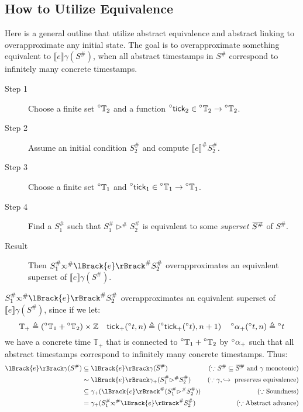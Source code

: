 \documentclass[acmsmall,screen,review]{acmart}\settopmatter{printfolios=true,printccs=false,printacmref=false}
\def\ovbarw{1.2mu}
\def\ovbarh{1}
\newcommand*{\ovbar}[1]{\mkern \ovbarw\overline{\mkern-\ovbarw{\smash{#1}\scalebox{1}[\ovbarh]{\vphantom{i}}}\mkern-\ovbarw}\mkern \ovbarw}
\newcommand*{\A}[1]{\prescript{\circ}{}{#1}}
\newcommand*{\Abs}[1]{{#1}^{\#}}
\newcommand*{\Time}{\mathbb{T}}
\newcommand*{\ATime}{\A{\Time}}
\newcommand*{\semarrow}{\hookrightarrow}
\newcommand*{\semlink}{\mathbin{\rotatebox[origin=c]{180}{$\propto$}}}
\newcommand*{\equivalent}{\sim}
\newcommand*{\sembracket}[1]{\lBrack{#1}\rBrack}
\newcommand*{\tick}{\mathsf{tick}}
\begin{document}
\subsection{How to Utilize Equivalence}
Here is a general outline that utilize abstract equivalence and abstract linking to overapproximate any initial state.
The goal is to overapproximate something equivalent to $\sembracket{e}\gamma(\Abs{S})$, when all abstract timestamps in $\Abs{S}$ correspond to infinitely many concrete timestamps.
\begin{description}
  \item[Step 1] Choose a finite set $\A\Time_2$ and a function $\A\tick_2\in\A\Time_2\rightarrow\A\Time_2$.
  \item[Step 2] Assume an initial condition $\Abs{S}_2$ and compute $\Abs{\sembracket{e}}\Abs{S}_2$.
  \item[Step 3] Choose a finite set $\A\Time_1$ and $\A\tick_1\in\A\Time_1\rightarrow\A\Time_1$.
  \item[Step 4] Find a $\Abs{S}_1$ such that $\Abs{S}_1\Abs\rhd\Abs{S}_2$ is equivalent to some \emph{superset} $\ovbar{\Abs{S}}$ of $\Abs{S}$.
  \item[Result] Then $\Abs{S}_1\Abs\semlink\Abs{\sembracket{e}}\Abs{S}_2$ overapproximates an equivalent superset of $\sembracket{e}\gamma(\Abs{S})$.
\end{description}
$\Abs{S}_1\Abs\semlink\Abs{\sembracket{e}}\Abs{S}_2$ overapproximates an equivalent superset of $\sembracket{e}\gamma(\Abs{S})$, since if we let:
\[\Time_+\triangleq(\ATime_1+\ATime_2)\times\mathbb{Z}\quad\tick_+(\A{t},n)\triangleq(\A\tick_+(\A{t}),n+1)\quad\A\alpha_+(\A{t},n)\triangleq\A{t}\]
we have a concrete time $\Time_+$ that is connected to $\ATime_1+\ATime_2$ by $\A\alpha_+$ such that all abstract timestamps correspond to infinitely many concrete timestamps.
Thus:
\begin{align*}
  \sembracket{e}\gamma(\Abs{S}) & \subseteq\sembracket{e}\gamma(\ovbar{\Abs{S}})                      & (\because\Abs{S}\subseteq\ovbar{\Abs{S}}\text{ and }\gamma\text{ monotonic}) \\
                                & \equivalent\sembracket{e}\gamma_+(\Abs{S}_1\Abs\rhd\Abs{S}_2)       & (\because\gamma,\semarrow\text{ preserves equivalence})                      \\
                                & \subseteq\gamma_+(\Abs{\sembracket{e}}(\Abs{S}_1\Abs\rhd\Abs{S}_2)) & (\because\text{Soundness})                                                   \\
                                & =\gamma_+(\Abs{S}_1\Abs\semlink\Abs{\sembracket{e}}\Abs{S}_2)       & (\because\text{Abstract advance})
\end{align*}
\end{document}
